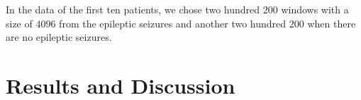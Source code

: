 In the data of the first ten patients, we chose two hundred $200$ windows with a size of $4096$ from the epileptic seizures and another two hundred $200$ when there are no epileptic seizures.

\section{Results and Discussion}
\label{sec:resu}

